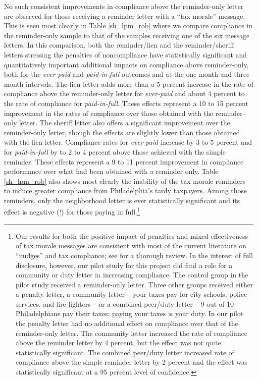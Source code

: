 \documentclass[12pt]{article}
\begin{document}
No such consistent improvements in compliance above the reminder-only letter are observed for those
receiving a reminder letter with a ``tax morale'' message.  This is
seen most clearly in Table \ref{sh_lpm_rob} where we compare
compliance in the reminder-only sample to that of the samples
receiving one of the six message letters. In this comparison, both the
reminder/lien and the reminder/sheriff letters stressing the penalties
of noncompliance have statistically significant
and quantitatively important additional impacts on compliance above reminder-only, both
for the \textit{ever-paid} and \textit{paid-in-full} outcomes and at
the one month and three month intervals. The lien letter adds more
than a 5 percent increase in the rate of compliance above the reminder-only
letter for \textit{ever-paid} and about 4 percent to the rate of
compliance for \textit{paid-in-full}. These effects represent a 10 to
15 percent improvement in the rates of compliance over those obtained
with the reminder-only letter.  The sheriff letter also offers a
significant improvement over the reminder-only letter, though the
effects are slightly lower than those obtained with the lien letter.
Compliance rates for \textit{ever-paid} increase by 3 to 5 percent and
for \textit{paid-in-full} by to 2 to 4 percent above those achieved
with the simple reminder.  These effects represent a 9 to 11 percent
improvement in compliance performance over what had been obtained with
a reminder only. Table \ref{sh_lpm_rob} also shows most clearly the
inability of the tax morale reminders to induce greater compliance
from Philadelphia's tardy taxpayers.  Among those reminders, only the
neighborhood letter is ever statistically significant and its effect
is negative (!) for those paying in full.\footnote{\label{fn:nudges}Our results for
  both the positive impact of penalties and mixed effectiveness of tax
  morale messages are consistent with most of the current literature
  on ``nudges'' and tax compliance; see \cite{Hallsworthb-14} for a
  thorough review. In the interest of full disclosure, however, our
  pilot study \cite{CILMS-16} for this project did find a role for a
  community or duty letter in increasing compliance.  The control
  group in the pilot study received a reminder-only letter.  Three
  other groups received either a penalty letter, a community letter --
  your taxes pay for city schools, police services, and fire fighters
  -- or a combined peer/duty letter -- 9 out of 10 Philadelphians pay
  their taxes; paying your taxes is your duty. In our pilot the
  penalty letter had no additional effect on compliance over that of
  the reminder-only letter.  The community letter increased the rate
  of compliance above the reminder letter by 4 percent, but the effect
  was not quite statistically significant.  The combined peer/duty
  letter increased rate of compliance above the simple reminder letter
  by 2 percent and the effect was statistically significant at a 95
  percent level of confidence.}
\end{document}
